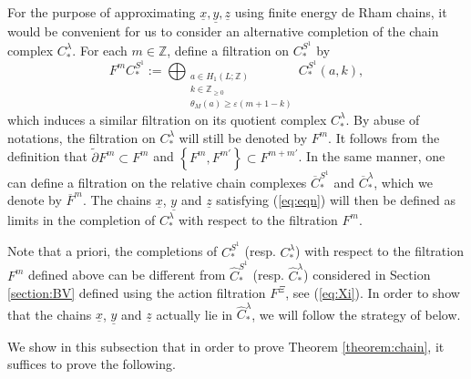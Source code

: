 \documentclass[a4paper]{article}
\numberwithin{equation}{section}
\begin{document}
For the purpose of approximating $\underline{x},\underline{y},\underline{z}$ using finite energy de Rham chains, it would be convenient for us to consider an alternative completion of the chain complex $C_\ast^\lambda$. For each $m\in\mathbb{Z}$, define a filtration on $C_\ast^{S^1}$ by
\begin{equation}\label{eq:filt}
F^mC_\ast^{S^1}:=\bigoplus_{\substack{a\in H_1(L;\mathbb{Z}) \\ k\in\mathbb{Z}_{\geq0}\\ \theta_M(a)\geq\varepsilon(m+1-k)}}C_\ast^{S^1}(a,k),
\end{equation}
which induces a similar filtration on its quotient complex $C_\ast^\lambda$. By abuse of notations, the filtration on $C_\ast^\lambda$ will still be denoted by $F^m$. It follows from the definition that $\tilde{\partial}F^m\subset F^m$ and $\left\{F^m,F^{m'}\right\}\subset F^{m+m'}$. In the same manner, one can define a filtration on the relative chain complexes $\overline{C}_\ast^{S^1}$ and $\overline{C}_\ast^\lambda$, which we denote by $\overline{F}^m$. The chains $\underline{x}$, $\underline{y}$ and $\underline{z}$ satisfying (\ref{eq:eqn}) will then be defined as limits in the completion of $C_\ast^\lambda$ with respect to the filtration $F^m$. 

Note that a priori, the completions of $C_\ast^{S^1}$ (resp. $C_\ast^\lambda$) with respect to the filtration $F^m$ defined above can be different from $\widehat{C}_\ast^{S^1}$ (resp. $\widehat{C}_\ast^\lambda$) considered in Section \ref{section:BV} defined using the action filtration $F^\Xi$, see (\ref{eq:Xi}). In order to show that the chains $\underline{x}$, $\underline{y}$ and $\underline{z}$ actually lie in $\widehat{C}_\ast^\lambda$, we will follow the strategy of \cite{ki3} below.

We show in this subsection that in order to prove Theorem \ref{theorem:chain}, it suffices to prove the following.
\end{document}
